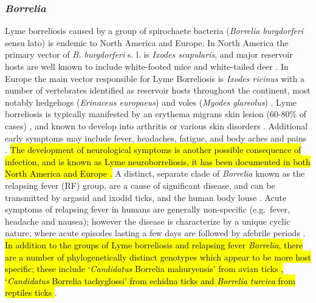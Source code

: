 \documentclass[a4paper, nobind]{templates/ociamthesis}
\begin{document}
\hypertarget{borrelia}{%
\subsubsection{\texorpdfstring{\emph{Borrelia}}{Borrelia}}\label{borrelia}}

Lyme borreliosis caused by a group of spirochaete bacteria (\emph{Borrelia burgdorferi} sensu lato) is endemic to North America and Europe.
In North America the primary vector of \emph{B. burgdorferi} s. l. is \emph{Ixodes scapularis}, and major reservoir hosts are well known to include white-footed mice and white-tailed deer \autocite{halseyRoleIxodesScapularis2018}.
In Europe the main vector responsible for Lyme Borreliosis is \emph{Ixodes ricinus} \autocite{kirsteinLocalVariationsDistribution1997} with a number of vertebrates identified as reservoir hosts throughout the continent, most notably hedgehogs (\emph{Erinaceus europaeus}) and voles (\emph{Myodes glareolus}) \autocite{jahfariMeltingPotTickborne2017,coipanGeneticDiversityBorrelia2018,estrada-penaHighThroughputSequencing2018}.
Lyme borreliosis is typically manifested by an erythema migrans skin lesion (60-80\% of cases) \autocite{rizzoliLymeBorreliosisEurope2011}, and known to develop into arthritis or various skin disorders \autocite{stanekLymeBorreliosis2012}.
Additional early symptoms may include fever, headaches, fatigue, and body aches and pains \autocite{rizzoliLymeBorreliosisEurope2011,clarkLymeBorreliosisHuman2013}.
\hl{The development of neurological symptoms is another possible consequence of infection, and is known as Lyme neuroborreliosis, it has been documented in both North America and Europe \autocite{clarkLymeBorreliosisHuman2013,strleComparisonFindingsPatients2006}.}
A distinct, separate clade of \emph{Borrelia} known as the relapsing fever (RF) group, are a cause of significant disease, and can be transmitted by argasid and ixodid ticks, and the human body louse \autocite{lopezTickBorneRelapsingFever2016}.
Acute symptoms of relapsing fever in humans are generally non-specific (e.g.~fever, headache and nausea); however the disease is characterize by a unique cyclic nature, where acute episodes lasting a few days are followed by afebrile periods \autocite{dworkinTickborneRelapsingFever2008}.
\hl{In addition to the groups of Lyme borreliosis and relapsing fever \emph{Borrelia}, there are a number of phylogenetically distinct genotypes which appear to be more host specific; these include `\emph{Candidatus} Borrelia mahuryensis' from avian ticks \autocite{munoz-lealCandidatusBorreliaIbitipoquensis2020}, `\emph{Candidatus} Borrelia tachyglossi' from echidna ticks \autocite{lohMolecularCharacterizationCandidatus2017} and \emph{Borrelia turcica} from reptiles ticks \autocite{gunerBorreliaTurcicaSp2004}}.
\end{document}
